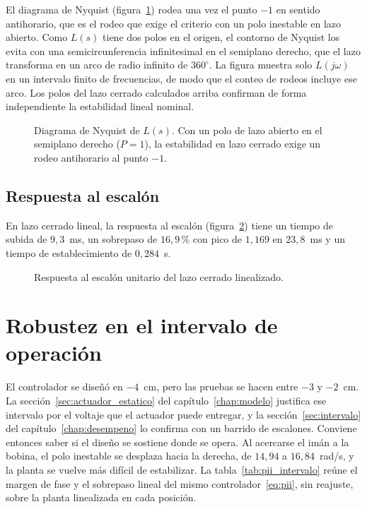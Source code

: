 El diagrama de Nyquist (figura~\ref{nyquist}) rodea una vez el punto $-1$ en sentido antihorario, que es el rodeo que exige el criterio con un polo inestable en lazo abierto. Como $L(s)$ tiene dos polos en el origen, el contorno de Nyquist los evita con una semicircunferencia infinitesimal en el semiplano derecho, que el lazo transforma en un arco de radio infinito de $360^\circ$. La figura muestra solo $L(j\omega)$ en un intervalo finito de frecuencias, de modo que el conteo de rodeos incluye ese arco. Los polos del lazo cerrado calculados arriba confirman de forma independiente la estabilidad lineal nominal.

\begin{figure}[ht]
    \centering
    
    \caption[Diagrama de Nyquist]{Diagrama de Nyquist de $L(s)$. Con un polo de lazo abierto en el semiplano derecho ($P=1$), la estabilidad en lazo cerrado exige un rodeo antihorario al punto $-1$.}
    \label{nyquist}
\end{figure}

\subsection{Respuesta al escalón}

En lazo cerrado lineal, la respuesta al escalón (figura~\ref{step_response}) tiene un tiempo de subida de $9{,}3$~ms, un sobrepaso de $16{,}9$\,\% con pico de $1{,}169$ en $23{,}8$~ms y un tiempo de establecimiento de $0{,}284$~s.

\begin{figure}[ht]
    \centering
    
    \caption[Respuesta al escalón]{Respuesta al escalón unitario del lazo cerrado linealizado.}
    \label{step_response}
\end{figure}

\section{Robustez en el intervalo de operación}\label{sec:robustez_pii}

El controlador se diseñó en $-4$~cm, pero las pruebas se hacen entre $-3$ y $-2$~cm. La sección~\ref{sec:actuador_estatico} del capítulo~\ref{chap:modelo} justifica ese intervalo por el voltaje que el actuador puede entregar, y la sección~\ref{sec:intervalo} del capítulo~\ref{chap:desempeno} lo confirma con un barrido de escalones. Conviene entonces saber si el diseño se sostiene donde se opera. Al acercarse el imán a la bobina, el polo inestable se desplaza hacia la derecha, de $14{,}94$ a $16{,}84$~rad/s, y la planta se vuelve más difícil de estabilizar. La tabla~\ref{tab:pii_intervalo} reúne el margen de fase y el sobrepaso lineal del mismo controlador~\eqref{eq:pii}, sin reajuste, sobre la planta linealizada en cada posición.

